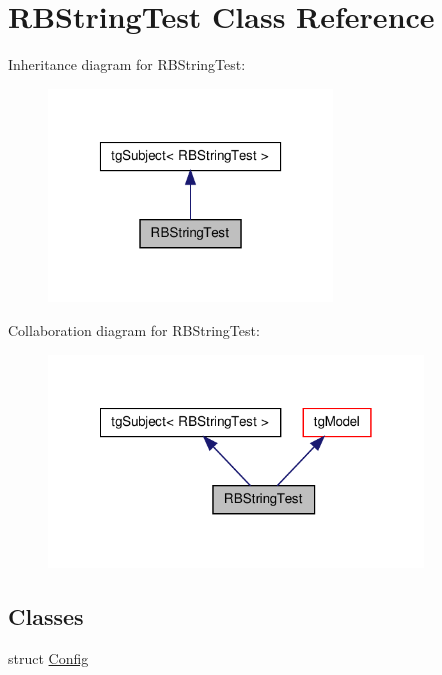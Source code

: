 \hypertarget{class_r_b_string_test}{\section{R\-B\-String\-Test Class Reference}
\label{class_r_b_string_test}
}


Inheritance diagram for R\-B\-String\-Test\-:\nopagebreak
\begin{figure}[H]
\begin{center}
\leavevmode
\includegraphics[width=214pt]{class_r_b_string_test__inherit__graph}
\end{center}
\end{figure}


Collaboration diagram for R\-B\-String\-Test\-:\nopagebreak
\begin{figure}[H]
\begin{center}
\leavevmode
\includegraphics[width=282pt]{class_r_b_string_test__coll__graph}
\end{center}
\end{figure}
\subsection*{Classes}
\begin{DoxyCompactItemize}
\item 
struct \hyperlink{struct_r_b_string_test_1_1_config}{Config}
\end{DoxyCompactItemize}
